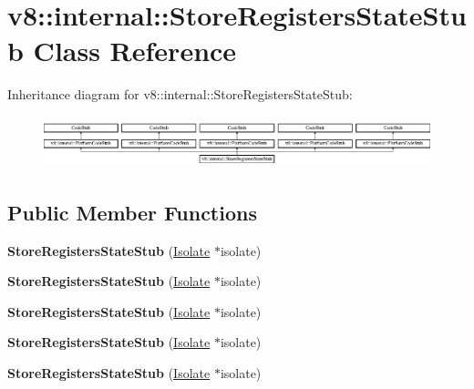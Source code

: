 \hypertarget{classv8_1_1internal_1_1_store_registers_state_stub}{}\section{v8\+:\+:internal\+:\+:Store\+Registers\+State\+Stub Class Reference}
\label{classv8_1_1internal_1_1_store_registers_state_stub}
Inheritance diagram for v8\+:\+:internal\+:\+:Store\+Registers\+State\+Stub\+:\begin{figure}[H]
\begin{center}
\leavevmode
\includegraphics[height=1.506727cm]{classv8_1_1internal_1_1_store_registers_state_stub}
\end{center}
\end{figure}
\subsection*{Public Member Functions}
\begin{DoxyCompactItemize}
\item 
{\bfseries Store\+Registers\+State\+Stub} (\hyperlink{classv8_1_1internal_1_1_isolate}{Isolate} $\ast$isolate)\hypertarget{classv8_1_1internal_1_1_store_registers_state_stub_a215a1b68cd6504717e7a9bc9f6c52288}{}\label{classv8_1_1internal_1_1_store_registers_state_stub_a215a1b68cd6504717e7a9bc9f6c52288}

\item 
{\bfseries Store\+Registers\+State\+Stub} (\hyperlink{classv8_1_1internal_1_1_isolate}{Isolate} $\ast$isolate)\hypertarget{classv8_1_1internal_1_1_store_registers_state_stub_a215a1b68cd6504717e7a9bc9f6c52288}{}\label{classv8_1_1internal_1_1_store_registers_state_stub_a215a1b68cd6504717e7a9bc9f6c52288}

\item 
{\bfseries Store\+Registers\+State\+Stub} (\hyperlink{classv8_1_1internal_1_1_isolate}{Isolate} $\ast$isolate)\hypertarget{classv8_1_1internal_1_1_store_registers_state_stub_a215a1b68cd6504717e7a9bc9f6c52288}{}\label{classv8_1_1internal_1_1_store_registers_state_stub_a215a1b68cd6504717e7a9bc9f6c52288}

\item 
{\bfseries Store\+Registers\+State\+Stub} (\hyperlink{classv8_1_1internal_1_1_isolate}{Isolate} $\ast$isolate)\hypertarget{classv8_1_1internal_1_1_store_registers_state_stub_a215a1b68cd6504717e7a9bc9f6c52288}{}\label{classv8_1_1internal_1_1_store_registers_state_stub_a215a1b68cd6504717e7a9bc9f6c52288}

\item 
{\bfseries Store\+Registers\+State\+Stub} (\hyperlink{classv8_1_1internal_1_1_isolate}{Isolate} $\ast$isolate)\hypertarget{classv8_1_1internal_1_1_store_registers_state_stub_a215a1b68cd6504717e7a9bc9f6c52288}{}\label{classv8_1_1internal_1_1_store_registers_state_stub_a215a1b68cd6504717e7a9bc9f6c52288}

\end{DoxyCompactItemize}
